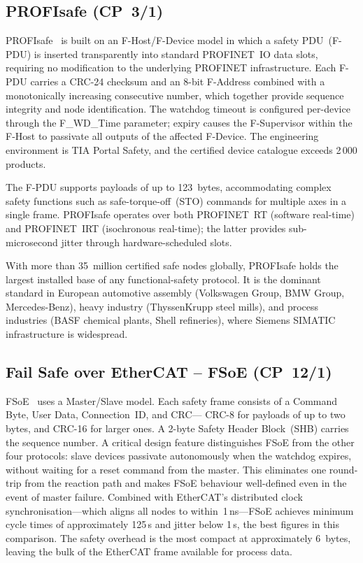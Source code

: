 \documentclass[conference]{IEEEtran}
\begin{document}
\subsection{PROFIsafe (CP~3/1)}

PROFIsafe~\cite{IEC617843,SiemensSafety} is built on an F-Host/F-Device
model in which a safety PDU~(F-PDU) is inserted transparently into
standard PROFINET~IO data slots, requiring no modification to the
underlying PROFINET infrastructure. Each F-PDU carries a CRC-24 checksum
and an 8-bit F-Address combined with a monotonically increasing consecutive
number, which together provide sequence integrity and node identification.
The watchdog timeout is configured per-device through the F\_WD\_Time
parameter; expiry causes the F-Supervisor within the F-Host to passivate
all outputs of the affected F-Device. The engineering environment is TIA
Portal Safety, and the certified device catalogue exceeds 2\,000 products.

The F-PDU supports payloads of up to 123~bytes, accommodating complex
safety functions such as safe-torque-off~(STO) commands for multiple axes
in a single frame. PROFIsafe operates over both PROFINET~RT (software
real-time) and PROFINET~IRT (isochronous real-time); the latter provides
sub-microsecond jitter through hardware-scheduled slots.

With more than 35~million certified safe nodes globally, PROFIsafe holds
the largest installed base of any functional-safety protocol. It is the
dominant standard in European automotive assembly (Volkswagen Group,
BMW Group, Mercedes-Benz), heavy industry (ThyssenKrupp steel mills), and
process industries (BASF chemical plants, Shell refineries), where Siemens
SIMATIC infrastructure is widespread.

\subsection{Fail Safe over EtherCAT -- FSoE (CP~12/1)}

FSoE~\cite{IEC617843,ETG5100} uses a Master/Slave model. Each safety
frame consists of a Command Byte, User Data, Connection~ID, and CRC---
CRC-8 for payloads of up to two bytes, and CRC-16 for larger ones.
A 2-byte Safety Header Block~(SHB) carries the sequence number.
A critical design feature distinguishes FSoE from the other four protocols:
slave devices passivate autonomously when the watchdog expires, without
waiting for a reset command from the master. This eliminates one round-trip
from the reaction path and makes FSoE behaviour well-defined even in the
event of master failure. Combined with EtherCAT's distributed clock
synchronisation---which aligns all nodes to within~1\,ns---FSoE achieves
minimum cycle times of approximately 125\,\textmu{}s and jitter below
1\,\textmu{}s, the best figures in this comparison.
The safety overhead is the most compact at approximately 6~bytes, leaving
the bulk of the EtherCAT frame available for process data.
\end{document}
